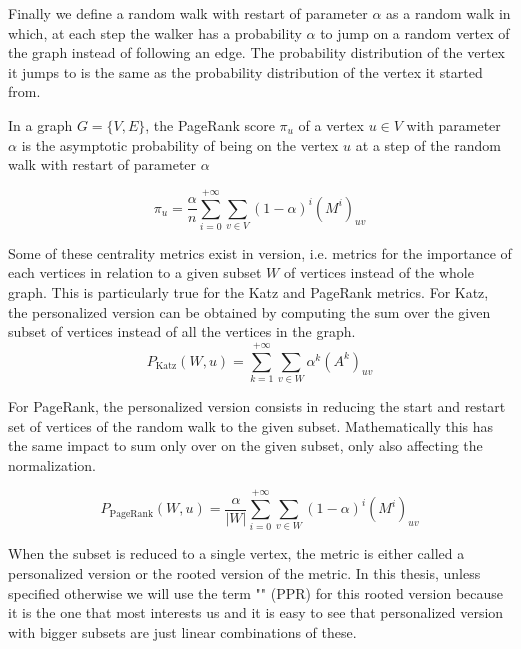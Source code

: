 Finally we define a random walk with restart of parameter $\alpha$ as a random walk in which, at each step the walker has a probability $\alpha$ to jump on a random vertex of the graph instead of following an edge. The probability distribution of the vertex it jumps to is the same as the probability distribution of the vertex it started from.

\begin{definition}
    In a graph $G = \{V, E\}$, the PageRank score $\pi_u$ of a vertex $u\in V$ with parameter $\alpha$ is the asymptotic probability of being on the vertex $u$ at a step of the random walk with restart of parameter $\alpha$

    \begin{equation}
        \pi_u = \frac{\alpha}{n} \sum_{i=0}^{+\infty} \sum_{v \in V} (1-\alpha)^i (M^i)_{uv}
    \end{equation}
\end{definition}

Some of these centrality metrics exist in   version, i.e. metrics for the importance of each vertices in relation to a given subset $W$ of vertices instead of the whole graph. This is particularly true for the Katz and PageRank metrics. For Katz, the personalized version can be obtained by computing the sum over the given subset of vertices instead of all the vertices in the graph.
\begin{equation}
    P_{\text{Katz}}(W, u) = \sum_{k= 1}^{+\infty}\sum_{v\in W} \alpha^k (A^k)_{uv}
\end{equation}

For PageRank, the personalized version consists in reducing the start and restart set of vertices of the random walk to the given subset. Mathematically this has the same impact to sum only over on the given subset, only also affecting the normalization.

\begin{equation}
    P_{\text{PageRank}}(W, u) = \frac{\alpha}{|W|} \sum_{i=0}^{+\infty} \sum_{v \in W} (1-\alpha)^i (M^i)_{uv}
\end{equation}

When the subset is reduced to a single vertex, the metric is either called a personalized version or the rooted version of the metric. In this thesis, unless specified otherwise we will use the term "" (PPR) for this rooted version because it is the one that most interests us and it is easy to see that personalized version with bigger subsets are just linear combinations of these.

